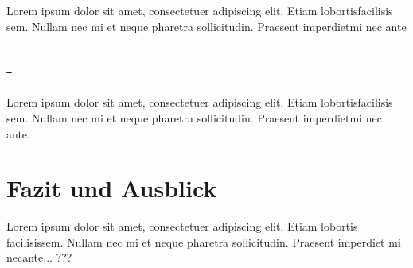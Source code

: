 \documentclass{article}
\begin{document}
	
	
	
	
	
	Lorem  ipsum  dolor  sit  amet,  consectetuer  adipiscing  
	elit.   Etiam  lobortisfacilisis sem.  Nullam nec mi et 
	neque pharetra sollicitudin.  Praesent imperdietmi nec ante
	
	\subsection{-}	
	Lorem  ipsum  dolor  sit  amet,  consectetuer  adipiscing  
	elit.   Etiam  lobortisfacilisis sem.  Nullam nec mi et 
	neque pharetra sollicitudin.  Praesent imperdietmi nec ante.  
	
	\section{Fazit und Ausblick}
	Lorem ipsum dolor sit amet, consectetuer adipiscing elit.  
	Etiam lobortis facilisissem.  Nullam nec mi et neque pharetra 
	sollicitudin.  Praesent imperdiet mi necante... ???
	
	\newpage	
	\printbibliography[title={\section{Referenzen}}]
	
\end{document}
